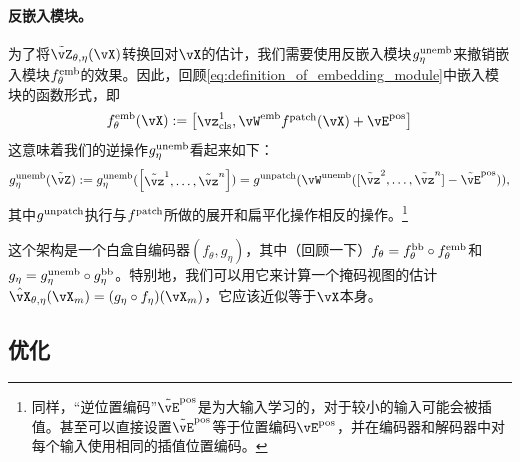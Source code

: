 \documentclass[../../book-main.tex]{subfiles}
\begin{document}
\paragraph{反嵌入模块。} 为了将\(\tilde{\vZ}_{\theta, \eta}(\vX)\)转换回对\(\vX\)的估计，我们需要使用反嵌入模块\(g_{\eta}^{\mathrm{unemb}}\)来撤销嵌入模块\(f_{\theta}^{\mathrm{emb}}\)的效果。因此，回顾\eqref{eq:definition_of_embedding_module}中嵌入模块的函数形式，即
\begin{equation}
    f_{\theta}^{\emb}(\vX) := \mat{\vz_{\cls}^{1}, \vW^{\emb}f^{\patch}(\vX) + \vE^{\pos}}
\end{equation}
这意味着我们的逆操作\(g_{\eta}^{\mathrm{unemb}}\)看起来如下：
\begin{equation}
    g_{\eta}^{\unemb}(\tilde{\vZ}) := g_{\eta}^{\unemb}(\mat{\tilde{\vz}^{1}, \dots, \tilde{\vz}^{n}}) = g^{\unpatch}(\vW^{\unemb}([\tilde{\vz}^{2}, \dots, \tilde{\vz}^{n}] - \tilde{\vE}^{\pos})),
\end{equation}
其中\(g^{\mathrm{unpatch}}\)执行与\(f^{\mathrm{patch}}\)所做的展开和扁平化操作相反的操作。\footnote{同样，“逆位置编码”\(\tilde{\vE}^{\pos}\)是为大输入学习的，对于较小的输入可能会被插值。甚至可以直接设置\(\tilde{\vE}^{\pos}\)等于位置编码\(\vE^{\pos}\)，并在编码器和解码器中对每个输入使用相同的插值位置编码。}

这个架构是一个白盒自编码器\((f_{\theta}, g_{\eta})\)，其中（回顾一下）\(f_{\theta} = f_{\theta}^{\mathrm{bb}} \circ f_{\theta}^{\mathrm{emb}}\)和\(g_{\eta} = g_{\eta}^{\mathrm{unemb}} \circ g_{\eta}^{\mathrm{bb}}\)。特别地，我们可以用它来计算一个掩码视图的估计\(\hat{\vX}_{\theta, \eta}(\vX_{m}) = (g_{\eta} \circ f_{\eta})(\vX_{m})\)，它应该近似等于\(\vX\)本身。

\subsection{优化}\label{sub:image_completion_optimization}
\end{document}
